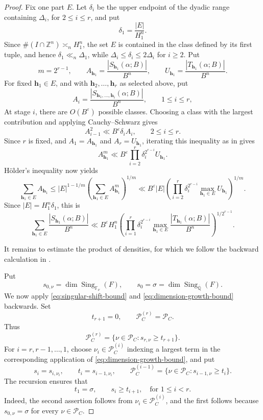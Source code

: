 \documentclass[reqno,a4paper,11pt]{amsart}
\numberwithin{equation}{section}
\newcommand{\ZZ}{\mathbb Z}
\newcommand{\QQ}{\mathbb Q}
\newcommand{\h}{\mathbf h}
\newcommand{\eps}{\varepsilon}
\theoremstyle{plain}
\theoremstyle{definition}
\begin{document}
\begin{proof}
Fix one part \(E\).
Let \(\delta_i\) be the upper endpoint of the dyadic range containing \(\Delta_i\), for \(2\leq i\leq r\), and put
\[
 \delta_1=\frac{|E|}{H_1^n}.
\]
Since \(\#(I\cap\ZZ^n)\asymp_n H_1^n\), the set \(E\) is contained in the class defined by its first tuple, and hence \(\delta_1\ll_n\Delta_1\), while \(\Delta_i\leq\delta_i\leq2\Delta_i\) for \(i\geq2\).
Put
\[
 m=2^{r-1},
 \qquad
 A_{\h_1}=\frac{|S_{\h_1}(\alpha;B)|}{B^n},
 \qquad
 U_{\h_1}=\frac{|T_{\h_1}(\alpha;B)|}{B^n}.
\]
For fixed \(\h_1\in E\), and with \(\h_2,\ldots,\h_r\) as selected above, put
\[
 A_i=\frac{|S_{\h_1,\ldots,\h_i}(\alpha;B)|}{B^n},
 \qquad 1\leq i\leq r,
\]
At stage \(i\), there are \(O(B^\eps)\) possible classes.
Choosing a class with the largest contribution and applying Cauchy--Schwarz gives
\[
 A_{i-1}^2\ll B^\eps\delta_iA_i,
 \qquad 2\leq i\leq r.
\]
Since \(r\) is fixed, and \(A_1=A_{\h_1}\) and \(A_r=U_{\h_1}\), iterating this inequality as in \cite[Eq.~(3.16)]{bp} gives
\[
 A_{\h_1}^{m}
 \ll B^\eps
 \prod_{i=2}^{r}\delta_i^{2^{r-i}}
 U_{\h_1}.
\]
H\"older's inequality now yields
\[
 \sum_{\h_1\in E}A_{\h_1}
 \leq |E|^{1-1/m}
 \left(\sum_{\h_1\in E}A_{\h_1}^m\right)^{1/m}
 \ll B^\eps |E|
 \left(
 \prod_{i=2}^{r}\delta_i^{2^{r-i}}
 \max_{\h_1\in E}U_{\h_1}
 \right)^{1/m}.
\]
Since \(|E|=H_1^n\delta_1\), this is
\[
 \sum_{\h_1\in E}\frac{|S_{\h_1}(\alpha;B)|}{B^n}
 \ll B^\eps H_1^n
 \left(
 \prod_{i=1}^{r}\delta_i^{2^{r-i}}
 \max_{\h_1\in E}
 \frac{|T_{\h_1}(\alpha;B)|}{B^n}
 \right)^{1/2^{r-1}}.
\]

It remains to estimate the product of densities, for which we follow the backward calculation in \cite[Proof of Lemma~3.5]{bp}.

Put
\[
 s_{0,\nu}
 =\dim\operatorname{Sing}_{\mathbb F_\nu}(F),
 \qquad s_0=\sigma=\dim\operatorname{Sing}_{\overline{\QQ}}(F).
\]
We now apply \eqref{eq:singular-shift-bound} and \eqref{eq:dimension-growth-bound} backwards.
Set
\[
 t_{r+1}=0,
 \qquad
 \mathcal P_C^{(r)}=\mathcal P_C.
\]
Thus
\[
 \mathcal P_C^{(r)}
 =\{\nu\in\mathcal P_C:s_{r,\nu}\geq t_{r+1}\}.
\]
For \(i=r,r-1,\ldots,1\), choose \(\nu_i\in\mathcal P_C^{(i)}\) indexing a largest term in the corresponding application of \eqref{eq:dimension-growth-bound}, and put
\[
 s_i=s_{i,\nu_i},
 \qquad
 t_i=s_{i-1,\nu_i},
 \qquad
 \mathcal P_C^{(i-1)}
 =\{\nu\in\mathcal P_C:s_{i-1,\nu}\geq t_i\}.
\]
The recursion ensures that
\[
 t_1=\sigma,
 \qquad
 s_i\geq t_{i+1},\quad\text{for }1\leq i<r.
\]
Indeed, the second assertion follows from \(\nu_i\in\mathcal P_C^{(i)}\), and the first follows because \(s_{0,\nu}=\sigma\) for every \(\nu\in\mathcal P_C\).


\end{proof}
\end{document}
